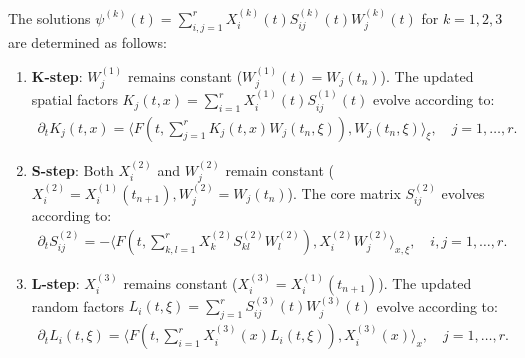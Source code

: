 \documentclass[10pt,a4paper]{amsart}
\begin{document}
\begin{lemma}
    The solutions $\psi^{(k)}(t) = \sum_{i,j=1}^r X_i^{(k)}(t) S_{ij}^{(k)}(t) W_j^{(k)}(t)$ for $k=1,2,3$ are determined as follows:
    \begin{enumerate}
        \item \textbf{K-step}: $W_j^{(1)}$ remains constant ($W_j^{(1)}(t) = W_j(t_n)$). The updated spatial factors $K_j(t, x) = \sum_{i=1}^r X_i^{(1)}(t) S_{ij}^{(1)}(t)$ evolve according to:
        \begin{align*}
            \partial_t K_j(t, x) = \langle F(t, \sum_{j=1}^r K_j(t, x) W_j(t_n, \xi)), W_j(t_n, \xi) \rangle_{\xi}, \quad j=1,\dots,r.
        \end{align*}
        \item \textbf{S-step}: Both $X_i^{(2)}$ and $W_j^{(2)}$ remain constant ($X_i^{(2)} = X_i^{(1)}(t_{n+1}), W_j^{(2)} = W_j(t_n)$). The core matrix $S_{ij}^{(2)}$ evolves according to:
        \begin{align*}
            \partial_t S_{ij}^{(2)} = -\langle F(t, \sum_{k,l=1}^r X_k^{(2)} S_{kl}^{(2)} W_l^{(2)}), X_i^{(2)} W_j^{(2)} \rangle_{x,\xi}, \quad i,j=1,\dots,r.
        \end{align*}
        \item \textbf{L-step}: $X_i^{(3)}$ remains constant ($X_i^{(3)} = X_i^{(1)}(t_{n+1})$). The updated random factors $L_i(t, \xi) = \sum_{j=1}^r S_{ij}^{(3)}(t) W_j^{(3)}(t)$ evolve according to:
        \begin{align*}
            \partial_t L_i(t, \xi) = \langle F(t, \sum_{i=1}^r X_i^{(3)}(x) L_i(t, \xi)), X_i^{(3)}(x) \rangle_{x}, \quad j=1,\dots,r.
        \end{align*}
    \end{enumerate}
\end{lemma}
\end{document}
